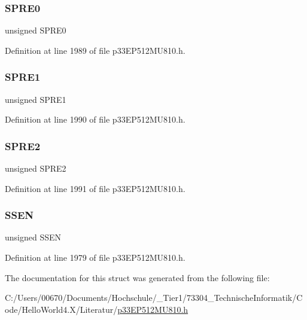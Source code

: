 \subsubsection{\texorpdfstring{S\+P\+R\+E0}{SPRE0}}
{\footnotesize\ttfamily unsigned S\+P\+R\+E0}



Definition at line 1989 of file p33\+E\+P512\+M\+U810.\+h.

\mbox{\label{structtag_s_p_i2_c_o_n1_b_i_t_s_aa10bf0541cfc6de804735f5e3beca089}} 
\subsubsection{\texorpdfstring{S\+P\+R\+E1}{SPRE1}}
{\footnotesize\ttfamily unsigned S\+P\+R\+E1}



Definition at line 1990 of file p33\+E\+P512\+M\+U810.\+h.

\mbox{\label{structtag_s_p_i2_c_o_n1_b_i_t_s_ad98c0587f19b608e8e40e67d2327634c}} 
\subsubsection{\texorpdfstring{S\+P\+R\+E2}{SPRE2}}
{\footnotesize\ttfamily unsigned S\+P\+R\+E2}



Definition at line 1991 of file p33\+E\+P512\+M\+U810.\+h.

\mbox{\label{structtag_s_p_i2_c_o_n1_b_i_t_s_ae77e6e9fafcdae4e5b7f261d00459ade}} 
\subsubsection{\texorpdfstring{S\+S\+EN}{SSEN}}
{\footnotesize\ttfamily unsigned S\+S\+EN}



Definition at line 1979 of file p33\+E\+P512\+M\+U810.\+h.



The documentation for this struct was generated from the following file\+:\begin{DoxyCompactItemize}
\item 
C\+:/\+Users/00670/\+Documents/\+Hochschule/\+\_\+\+Tier1/73304\+\_\+\+Technische\+Informatik/\+Code/\+Hello\+World4.\+X/\+Literatur/\hyperlink{p33_e_p512_m_u810_8h}{p33\+E\+P512\+M\+U810.\+h}\end{DoxyCompactItemize}
